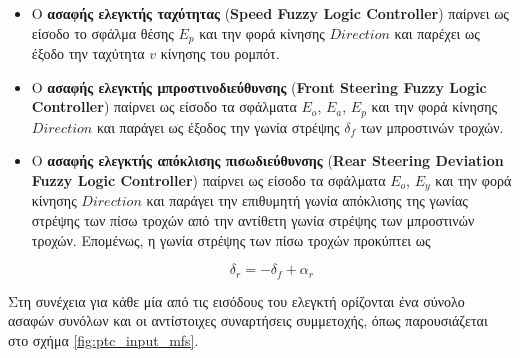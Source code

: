 \begin{itemize}
	\item Ο \textbf{ασαφής ελεγκτής ταχύτητας} (\textbf{Speed Fuzzy Logic Controller}) παίρνει ως είσοδο το σφάλμα θέσης $E_p$ και την φορά κίνησης $Direction$ και παρέχει ως έξοδο την ταχύτητα $v$ κίνησης του ρομπότ.

	\item Ο \textbf{ασαφής ελεγκτής μπροστινοδιεύθυνσης} (\textbf{Front Steering Fuzzy Logic Controller}) παίρνει ως είσοδο τα σφάλματα $E_o$, $E_a$, $E_p$ και την φορά κίνησης $Direction$ και παράγει ως έξοδος την γωνία στρέψης $\delta_f$ των μπροστινών τροχών.
	
	\item Ο \textbf{ασαφής ελεγκτής απόκλισης πισωδιεύθυνσης} (\textbf{Rear Steering Deviation Fuzzy Logic Controller}) παίρνει ως είσοδο τα σφάλματα $E_o$, $E_y$ και την φορά κίνησης $Direction$ και παράγει την επιθυμητή γωνία απόκλισης της γωνίας στρέψης των πίσω τροχών από την αντίθετη γωνία στρέψης των μπροστινών τροχών. Επομένως, η γωνία στρέψης των πίσω τροχών προκύπτει ως 
	
\begin{equation}
	\delta_r = - \delta_f + \alpha_r	
\end{equation}

\end{itemize}


\bigskip
Στη συνέχεια για κάθε μία από τις εισόδους του ελεγκτή ορίζονται ένα σύνολο ασαφών συνόλων και οι αντίστοιχες συναρτήσεις συμμετοχής, όπως παρουσιάζεται στο σχήμα \ref{fig:ptc_input_mfs}.

